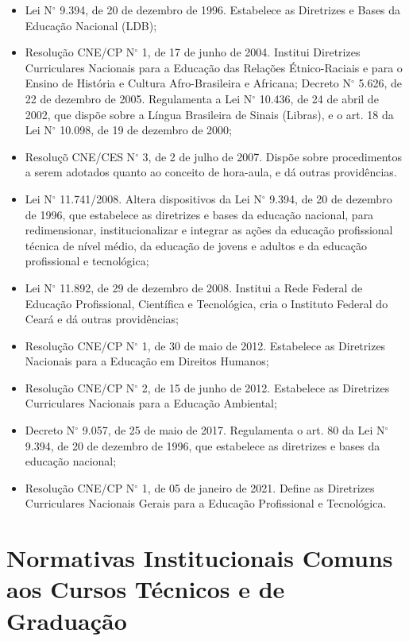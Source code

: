 \documentclass[
	12pt,				%
	openright,			%
	twoside,			%
	a4paper,			%
	chapter=TITLE,		%
	english,			%
	french,				%
	spanish,			%
	brazil,				%
	]{abntex2}
\newcommand{\nord}[1]{N$^\circ$ #1}
\begin{document}
\begin{itemize}
   \item Lei \nord{9.394}, de 20 de dezembro de 1996. Estabelece as Diretrizes e Bases da Educa\c{c}\~ao Nacional (LDB);
\item Resolu\c{c}\~ao CNE/CP \nord{1}, de 17 de junho de 2004. Institui Diretrizes Curriculares Nacionais para a Educa\c{c}\~ao das Rela\c{c}\~oes \'Etnico-Raciais e para o Ensino de Hist\'oria e Cultura Afro-Brasileira e Africana;
Decreto \nord{5.626}, de 22 de dezembro de 2005. Regulamenta a Lei \nord{10.436}, de 24 de abril
de 2002, que disp\~oe sobre a L\'i­ngua Brasileira de Sinais (Libras), e o art. 18 da Lei \nord{10.098},
de 19 de dezembro de 2000;
\item  Resolu\c{c}\~o CNE/CES \nord{3}, de 2 de julho de 2007. Disp\~oe sobre procedimentos a serem
adotados quanto ao conceito de hora-aula, e d\'a outras provid\^encias.
\item  Lei \nord{11.741/2008}. Altera dispositivos da Lei \nord{9.394}, de 20 de dezembro de 1996, que
estabelece as diretrizes e bases da educa\c{c}\~ao nacional, para redimensionar, institucionalizar
e integrar as a\c{c}\~oes da educa\c{c}\~ao profissional t\'ecnica de n\'ivel m\'edio, da educa\c{c}\~ao de jovens
e adultos e da educa\c{c}\~ao profissional e tecnol\'ogica;
\item Lei \nord{11.892}, de 29 de dezembro de 2008. Institui a Rede Federal de Educa\c{c}\~ao Profissional,
Cient\'ifica e Tecnol\'ogica, cria o Instituto Federal do Cear\'a e d\'a outras provid\^encias;
\item Resolu\c{c}\~ao CNE/CP \nord{1}, de 30 de maio de 2012. Estabelece as Diretrizes Nacionais para a
Educa\c{c}\~ao em Direitos Humanos;

\item Resolu\c{c}\~ao CNE/CP \nord{2}, de 15 de junho de 2012. Estabelece as Diretrizes Curriculares
Nacionais para a Educa\c{c}\~ao Ambiental;
\item Decreto \nord{9.057}, de 25 de maio de 2017. Regulamenta o art. 80 da Lei \nord{9.394}, de 20 de
dezembro de 1996, que estabelece as diretrizes e bases da educa\c{c}\~ao nacional;
\item Resolu\c{c}\~ao CNE/CP \nord{1}, de 05 de janeiro de 2021. Define as Diretrizes Curriculares Nacionais
Gerais para a Educa\c{c}\~ao Profissional e Tecnol\'ogica.
\end{itemize}

\section{Normativas Institucionais Comuns aos Cursos Técnicos e de Graduação}
\end{document}

